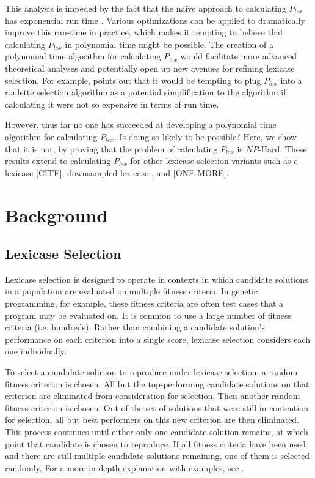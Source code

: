 \documentclass[sigconf]{acmart}
\begin{document}
This analysis is impeded by the fact that the naive approach to calculating $P_{lex}$ has exponential run time \citep{la_cava_probabilistic_2018}. Various optimizations can be applied to dramatically improve this run-time in practice, which makes it tempting to believe that calculating $P_{lex}$ in polynomial time might be possible. The creation of a polynomial time algorithm for calculating $P_{lex}$ would facilitate more advanced theoretical analyses and potentially open up new avenues for refining lexicase selection. For example, \citep{la_cava_probabilistic_2018} points out that it would be tempting to plug $P_{lex}$ into a roulette selection algorithm as a potential simplification to the algorithm if calculating it were not so expensive in terms of run time.

However, thus far no one has succeeded at developing a polynomial time algorithm for calculating $P_{lex}$. Is doing so likely to be possible? Here, we show that it is not, by proving that the problem of calculating $P_{lex}$ is $NP$-Hard. These results extend to calculating $P_{lex}$ for other lexicase selection variants such as $\epsilon$-lexicase [CITE], downsampled lexicase \citep{hernandez_random_2019,ferguson_characterizing_2020}, and [ONE MORE].

\section{Background}

\subsection{Lexicase Selection}

Lexicase selection is designed to operate in contexts in which candidate solutions in a population are evaluated on multiple fitness criteria. In genetic programming, for example, these fitness criteria are often test cases that a program may be evaluated on. It is common to use a large number of fitness criteria (i.e. hundreds). Rather than combining a candidate solution's performance on each criterion into a single score, lexicase selection considers each one individually. 

To select a candidate solution to reproduce under lexicase selection, a random fitness criterion is chosen. All but the top-performing candidate solutions on that criterion are eliminated from consideration for selection. Then another random fitness criterion is chosen. Out of the set of solutions that were still in contention for selection, all but best performers on this new criterion are then eliminated. This process continues until either only one candidate solution remains, at which point that candidate is chosen to reproduce. If all fitness criteria have been used and there are still multiple candidate solutions remaining, one of them is selected randomly. For a more in-depth explanation with examples, see \citep{spector_assessment_2012, la_cava_probabilistic_2018}.
\end{document}
